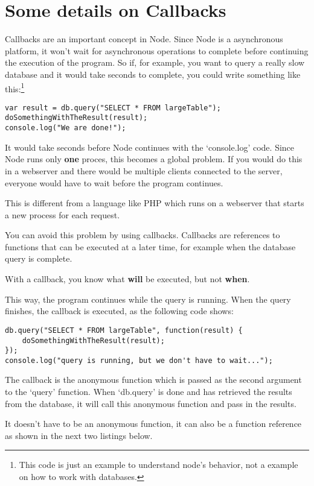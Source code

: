 \documentclass[a4paper]{report}
\begin{document}
\section*{Some details on Callbacks} 
Callbacks are an important concept in Node. Since Node is a asynchronous platform, it won't wait for asynchronous operations to complete before continuing the execution of the program. So if, for example, you want to query a really slow database and it would take seconds to complete, you could write something like this:\footnote{This code is just an example to understand node's behavior, not a example on how to work with databases.} 
\begin{lstlisting} 
var result = db.query("SELECT * FROM largeTable"); 
doSomethingWithTheResult(result); 
console.log("We are done!"); 
\end{lstlisting}
\noindent It would take seconds before Node continues with the `console.log' code. Since Node runs only \textbf{one} proces, this becomes a global problem. If you would do this in a webserver and there would be multiple clients connected to the server, everyone would have to wait before the program continues.  
 
This is different from a language like PHP which runs on a webserver that starts a new process for each request. 
 
You can avoid this problem by using callbacks. Callbacks are references to functions that can be executed at a later time, for example when the database query is complete.  
 
With a callback, you know what \textbf{will} be executed, but not \textbf{when}. 
 
This way, the program continues while the query is running. When the query finishes, the callback is executed, as the following code shows: 
 
\begin{lstlisting} 
db.query("SELECT * FROM largeTable", function(result) { 
	doSomethingWithTheResult(result); 
}); 
console.log("query is running, but we don't have to wait..."); 
\end{lstlisting} 
 
\noindent The callback is the anonymous function which is passed as the second argument to the `query' function. When `db.query' is done and has retrieved the results from the database, it will call this anonymous function and pass in the results. 
 
It doesn't have to be an anonymous function, it can also be a function reference as shown in the next two listings below. 
 
\end{document}
